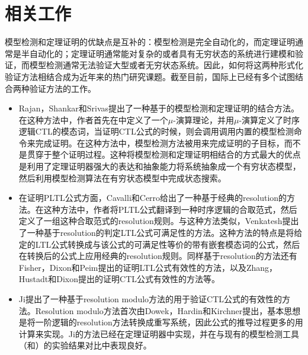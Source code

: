 \section{相关工作}
模型检测和定理证明的优缺点是互补的：模型检测是完全自动化的，而定理证明通常是半自动化的；定理证明通常能对复杂的或者具有无穷状态的系统进行建模和验证，而模型检测通常无法验证大型或者无穷状态系统。因此，如何将这两种形式化验证方法相结合成为近年来的热门研究课题。截至目前，国际上已经有多个试图结合两种验证方法的工作。
\begin{itemize}
	\item Rajan，Shankar和Srivas提出了一种基于的模型检测和定理证明的结合方法\cite{RajanSS95}。在这种方法中，作者首先在中定义了一个$\mu$-演算理论，并用$\mu$-演算定义了时序逻辑\textsf{CTL}的模态词，当证明\textsf{CTL}公式的时候，则会调用调用内置的模型检测命令来完成证明。在这种方法中，模型检测方法被用来完成证明的子目标，而不是贯穿于整个证明过程。这种将模型检测和定理证明相结合的方式最大的优点是利用了定理证明器强大的表达和抽象能力将系统抽象成一个有穷状态模型，然后利用模型检测算法在有穷状态模型中完成状态搜索。
	\item 在证明\textsf{PLTL}公式方面，Cavalli和Cerro给出了一种基于经典的resolution的方法\cite{CavalliC84}。在这种方法中，作者将\textsf{PLTL}公式翻译到一种时序逻辑的合取范式，然后定义了一组这种合取范式的resolution规则。与这种方法类似，Venkatesh提出了一种基于resolution的判定\textsf{LTL}公式可满足性的方法\cite{Venkatesh85}。这种方法的特点是将给定的\textsf{LTL}公式转换成与该公式的可满足性等价的带有嵌套模态词的公式，然后在转换后的公式上应用经典的resolution规则。同样基于resolution的方法还有Fisher，Dixon和Peim提出的证明\textsf{LTL}公式有效性的方法\cite{FisherDP01}，以及Zhang，Hustadt和Dixon提出的证明\textsf{CTL}公式有效性的方法\cite{ZhangHD14}等。
	\item Ji提出了一种基于resolution modulo方法的用于验证\textsf{CTL}公式的有效性的方法\cite{Ji15}。Resolution modulo方法首次由Dowek，Hardin和Kirchner提出\cite{DowekHK03,Dowek10}，基本思想是将一阶逻辑的resolution方法转换成重写系统，因此公式的推导过程更多的用计算来实现。Ji的方法已经在定理证明器中实现，并在与现有的模型检测工具（\nusmv{}和\verds{}）的实验结果对比中表现良好。
\end{itemize}
